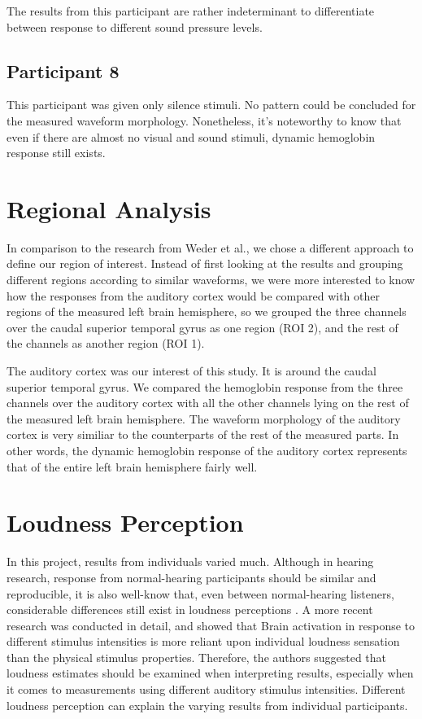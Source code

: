 The results from this participant are rather indeterminant to differentiate between response to different sound pressure levels.


\subsection {Participant 8}
This participant was given only silence stimuli. No pattern could be concluded for the measured waveform morphology. Nonetheless, it's noteworthy to know that even if there are almost no visual and sound stimuli, dynamic hemoglobin response still exists.

\section {Regional Analysis}
In comparison to the research from Weder et al., we chose a different approach to define our region of interest. Instead of first looking at the results and grouping different regions according to similar waveforms, we were more interested to know how the responses from the auditory cortex would be compared with other regions of the measured left brain hemisphere, so we grouped the three channels over the caudal superior temporal gyrus as one region (ROI 2), and the rest of the channels as another region (ROI 1).

The auditory cortex was our interest of this study. It is around the caudal superior temporal gyrus. We compared the hemoglobin response from the three channels over the auditory cortex with all the other channels lying on the rest of the measured left brain hemisphere. The waveform morphology of the auditory cortex is very similiar to the counterparts of the rest of the measured parts. In other words, the dynamic hemoglobin response of the auditory cortex represents that of the entire left brain hemisphere fairly well.

\section{Loudness Perception}
In this project, results from individuals varied much. Although in hearing research, response from normal-hearing participants should be similar and reproducible, it is also well-know that, even between normal-hearing listeners,
considerable differences still exist in loudness perceptions \cite {Brand2001}. A more recent research \cite {Weder2020} was conducted in detail, and showed that Brain activation in response to different stimulus intensities is more reliant upon individual loudness sensation than the physical stimulus properties. Therefore, the authors suggested that loudness
estimates should be examined when interpreting results, especially when it comes to measurements using different auditory stimulus intensities. Different loudness perception can explain the varying results from individual participants.